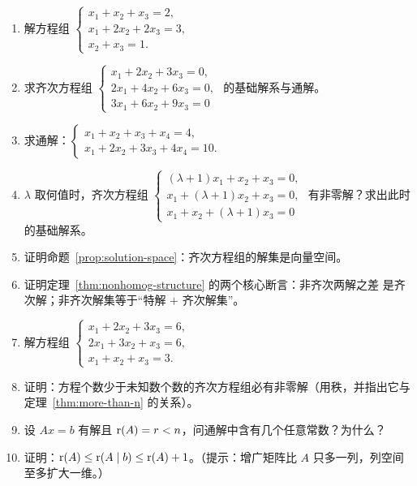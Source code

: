 
\begin{enumerate}[label=\arabic*., itemsep=2pt]
\item 解方程组 $\begin{cases} x_1+x_2+x_3=2, \\ x_1+2x_2+2x_3=3, \\ x_2+x_3=1. \end{cases}$
\item 求齐次方程组
  $\begin{cases} x_1+2x_2+3x_3=0, \\ 2x_1+4x_2+6x_3=0, \\ 3x_1+6x_2+9x_3=0 \end{cases}$
  的基础解系与通解。
\item 求通解：$\begin{cases} x_1+x_2+x_3+x_4=4, \\ x_1+2x_2+3x_3+4x_4=10. \end{cases}$
\item $\lambda$ 取何值时，齐次方程组
  $\begin{cases} (\lambda+1)x_1+x_2+x_3=0, \\ x_1+(\lambda+1)x_2+x_3=0, \\
  x_1+x_2+(\lambda+1)x_3=0 \end{cases}$
  有非零解？求出此时的基础解系。
\item 证明命题~\ref{prop:solution-space}：齐次方程组的解集是向量空间。
\item 证明定理~\ref{thm:nonhomog-structure} 的两个核心断言：非齐次两解之差
  是齐次解；非齐次解集等于“特解 $+$ 齐次解集”。
\item 解方程组 $\begin{cases} x_1+2x_2+3x_3=6, \\ 2x_1+3x_2+x_3=6, \\
  x_1+x_2+x_3=3. \end{cases}$
\item 证明：方程个数少于未知数个数的齐次方程组必有非零解（用秩，并指出它与
  定理~\ref{thm:more-than-n} 的关系）。
\item 设 $Ax=b$ 有解且 $\operatorname{r}(A)=r<n$，问通解中含有几个任意常数？为什么？
\item 证明：$\operatorname{r}(A)\le\operatorname{r}(A\mid b)\le\operatorname{r}(A)+1$。（提示：增广矩阵比 $A$
  只多一列，列空间至多扩大一维。）
\end{enumerate}
